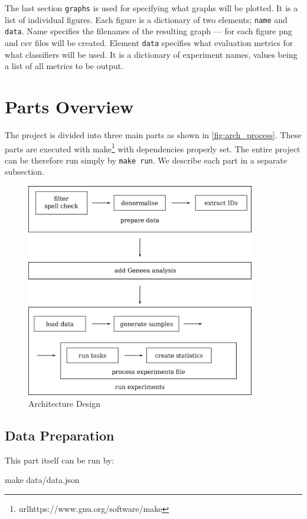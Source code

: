 The last section \texttt{graphs} is used for specifying what graphs will be plotted.
It is a list of individual figures.
Each figure is a dictionary of two elements; \texttt{name} and \texttt{data}.
Name specifies the filenames of the resulting graph ---
for each figure png and csv files will be created.
Element \texttt{data} specifies what evaluation metrics for what classifiers will be used.
It is a dictionary of experiment names, values being a list of all metrics to be output.

\section{Parts Overview}

The project is divided into three main parts as shown in \autoref{fig:arch_process}.
These parts are executed with make\footnote{url{https://www.gnu.org/software/make}} with dependencies properly set.
The entire project can be therefore run simply by \texttt{make run}.
We describe each part in a separate subsection.

\begin{figure}[h]
    \centering
	\includegraphics[width=10cm]{figures/arch_process.eps}
	\caption{Architecture Design}\label{fig:arch_process}
\end{figure}


\subsection{Data Preparation} 

This part itself can be run by:

\begin{code}
make data/data.json
\end{code}

